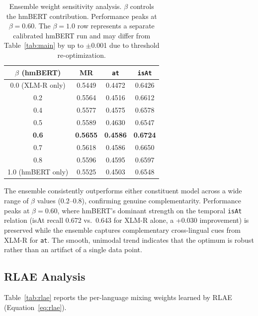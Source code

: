 \documentclass[11pt,a4paper]{article}
\begin{document}
\begin{table}[t]
\centering
\caption{Ensemble weight sensitivity analysis. $\beta$ controls the hmBERT contribution. Performance peaks at $\beta=0.60$. The $\beta=1.0$ row represents a separate calibrated hmBERT run and may differ from Table~\ref{tab:main} by up to $\pm$0.001 due to threshold re-optimization.}
\label{tab:beta}
\begin{tabular}{cccc}
\toprule
$\beta$ \textbf{(hmBERT)} & \textbf{MR} & \textbf{\texttt{at}} & \textbf{\texttt{isAt}} \\
\midrule
0.0 (XLM-R only) & 0.5449 & 0.4472 & 0.6426 \\
0.2 & 0.5564 & 0.4516 & 0.6612 \\
0.4 & 0.5577 & 0.4575 & 0.6578 \\
0.5 & 0.5589 & 0.4630 & 0.6547 \\
\textbf{0.6} & \textbf{0.5655} & \textbf{0.4586} & \textbf{0.6724} \\
0.7 & 0.5618 & 0.4586 & 0.6650 \\
0.8 & 0.5596 & 0.4595 & 0.6597 \\
1.0 (hmBERT only) & 0.5525 & 0.4503 & 0.6548 \\
\bottomrule
\end{tabular}
\end{table}

The ensemble consistently outperforms either constituent model across a wide range of $\beta$ values (0.2--0.8), confirming genuine complementarity. Performance peaks at $\beta=0.60$, where hmBERT's dominant strength on the temporal \texttt{isAt} relation (isAt recall 0.672 vs.\ 0.643 for XLM-R alone, a +0.030 improvement) is preserved while the ensemble captures complementary cross-lingual cues from XLM-R for \texttt{at}. The smooth, unimodal trend indicates that the optimum is robust rather than an artifact of a single data point.

\subsection{RLAE Analysis}
\label{sec:rlae_analysis}

Table~\ref{tab:rlae} reports the per-language mixing weights learned by RLAE (Equation~\ref{eq:rlae}).
\end{document}
